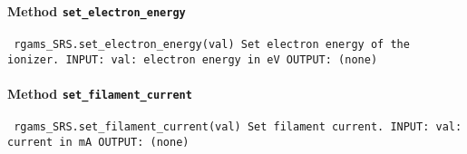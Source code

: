 \paragraph{Method \texttt{set_electron_energy}}
\vspace{1ex}
\texttt{\newline
rgams_SRS.set_electron_energy(val)\newline
\newline
Set electron energy of the ionizer.\newline
\newline
INPUT:\newline
val: electron energy in eV\newline
\newline
OUTPUT:\newline
(none)\newline
\newline
}

\paragraph{Method \texttt{set_filament_current}}
\vspace{1ex}
\texttt{\newline
rgams_SRS.set_filament_current(val)\newline
\newline
Set filament current.\newline
\newline
INPUT:\newline
val: current in mA\newline
\newline
OUTPUT:\newline
(none)\newline
\newline
}

